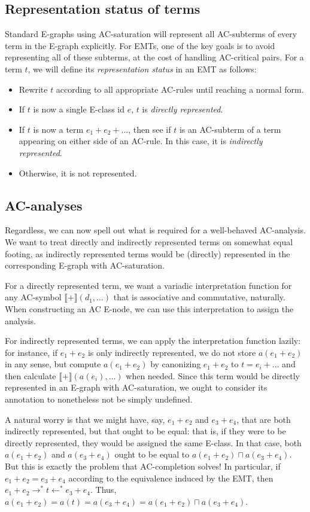 \documentclass[12pt,a4paper,twoside,openright]{report}
\numberwithin{equation}{chapter}		%
\numberwithin{figure}{chapter}			%
\numberwithin{table}{chapter}			%
\theoremstyle{definition}
\theoremstyle{plain}
\begin{document}
\subsection{Representation status of terms}
Standard E-graphs using AC-saturation will represent all AC-subterms of every term in the E-graph explicitly. For EMTs, one of the key goals is to avoid representing all of these subterms, at the cost of handling AC-critical pairs. For a term $t$, we will define its \emph{representation status} in an EMT as follows:
\begin{itemize}
	\item Rewrite $t$ according to all appropriate AC-rules until reaching a normal form.
	\item If $t$ is now a single E-class id $e$, $t$ is \emph{directly represented}.
	\item If $t$ is now a term $e_1 + e_2 + \ldots$, then see if $t$ is an AC-subterm of a term appearing on either side of an AC-rule. In this case, it is \emph{indirectly represented}.
	\item Otherwise, it is not represented.
\end{itemize}

\subsection{AC-analyses}
Regardless, we can now spell out what is required for a well-behaved AC-analysis. We want to treat directly and indirectly represented terms on somewhat equal footing, as indirectly represented terms would be (directly) represented in the corresponding E-graph with AC-saturation.

For a directly represented term, we want a variadic interpretation function for any AC-symbol $\llbracket + \rrbracket (d_1, \ldots)$ that is associative and commutative, naturally. When constructing an AC E-node, we can use this interpretation to assign the analysis.

For indirectly represented terms, we can apply the interpretation function lazily: for instance, if $e_1 + e_2$ is only indirectly represented, we do not store $a(e_1 + e_2)$ in any sense, but compute $a(e_1 + e_2)$ by canonizing $e_1 + e_2$ to $t = e_i + \ldots$ and then calculate $\llbracket + \rrbracket(a(e_i), \ldots)$ when needed. Since this term would be directly represented in an E-graph with AC-saturation, we ought to consider its annotation to nonetheless not be simply undefined.

A natural worry is that we might have, say, $e_1 + e_2$ and $e_3 + e_4$, that are both indirectly represented, but that ought to be equal: that is, if they were to be directly represented, they would be assigned the same E-class. In that case, both $a(e_1 + e_2)$ and $a(e_3 + e_4)$ ought to be equal to $a(e_1 + e_2) \sqcap a(e_3 + e_4)$. But this is exactly the problem that AC-completion solves! In particular, if $e_1 + e_2 = e_3 + e_4$ according to the equivalence induced by the EMT, then $e_1 + e_2 \rightarrow^* t \leftarrow^* e_3 + e_4$. Thus, $a(e_1 + e_2) = a(t) = a(e_3 + e_4) = a(e_1 + e_2) \sqcap a(e_3 + e_4)$.
\end{document}
